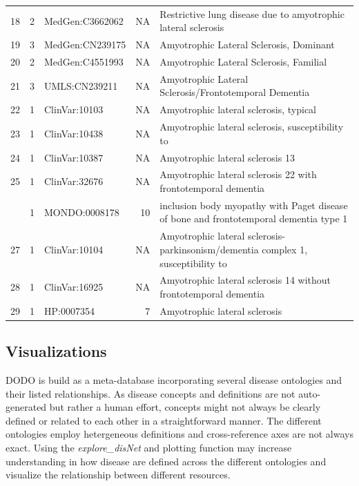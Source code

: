 \documentclass[9pt,a4paper,]{extarticle}
\begin{document}
\begin{table}
{\begin{tabular}[t]{rrlrl}
18 & 2 & MedGen:C3662062 & NA & Restrictive lung disease due to amyotrophic lateral sclerosis\\
\rowcolor{gray!6}  19 & 3 & MedGen:CN239175 & NA & Amyotrophic Lateral Sclerosis, Dominant\\
20 & 2 & MedGen:C4551993 & NA & Amyotrophic Lateral Sclerosis, Familial\\
\addlinespace
\rowcolor{gray!6}  21 & 3 & UMLS:CN239211 & NA & Amyotrophic Lateral Sclerosis/Frontotemporal Dementia\\
22 & 1 & ClinVar:10103 & NA & Amyotrophic lateral sclerosis, typical\\
\rowcolor{gray!6}  23 & 1 & ClinVar:10438 & NA & Amyotrophic lateral sclerosis, susceptibility to\\
24 & 1 & ClinVar:10387 & NA & Amyotrophic lateral sclerosis 13\\
\rowcolor{gray!6}  25 & 1 & ClinVar:32676 & NA & Amyotrophic lateral sclerosis 22 with frontotemporal dementia\\
\addlinespace
26 & 1 & MONDO:0008178 & 10 & inclusion body myopathy with Paget disease of bone and frontotemporal dementia type 1\\
\rowcolor{gray!6}  27 & 1 & ClinVar:10104 & NA & Amyotrophic lateral sclerosis-parkinsonism/dementia complex 1, susceptibility to\\
28 & 1 & ClinVar:16925 & NA & Amyotrophic lateral sclerosis 14 without frontotemporal dementia\\
\rowcolor{gray!6}  29 & 1 & HP:0007354 & 7 & Amyotrophic lateral sclerosis\\
\bottomrule
\end{tabular}}
\end{table}

\hypertarget{visualizations}{%
\subsection{Visualizations}\label{visualizations}}

DODO is build as a meta-database incorporating several disease ontologies and their listed relationships. As disease concepts and definitions are not auto-generated but rather a human effort, concepts might not always be clearly defined or related to each other in a straightforward manner. The different ontologies employ hetergeneous definitions and cross-reference axes are not always exact. Using the \emph{explore\_disNet} and plotting function may increase understanding in how disease are defined across the different ontologies and visualize the relationship between different resources.
\end{document}

